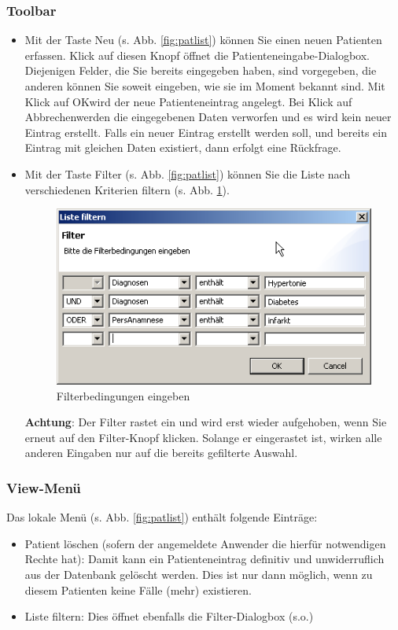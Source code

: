 \subsubsection{Toolbar}
\begin{itemize}
  \item Mit der Taste \glqq Neu\grqq{} (s. Abb. \ref{fig:patlist}) können Sie
  einen neuen Patienten erfassen. Klick
  auf diesen Knopf öffnet die Patienteneingabe-Dialogbox. Diejenigen Felder, die
  Sie bereits eingegeben haben, sind vorgegeben, die anderen können Sie soweit
  eingeben, wie sie im Moment bekannt sind. Mit Klick auf \glqq OK\grqq{}wird
  der neue Patienteneintrag angelegt. Bei Klick auf \glqq Abbrechen\grqq{}werden
  die eingegebenen Daten verworfen und es wird kein neuer Eintrag erstellt.
  Falls ein neuer Eintrag erstellt werden soll, und bereits ein Eintrag mit
  gleichen Daten existiert, dann erfolgt eine Rückfrage.

  \item Mit der Taste \glqq Filter\grqq{} (s. Abb. \ref{fig:patlist}) können Sie
  die Liste nach
  verschiedenen Kriterien filtern (s. Abb. \ref{fig:patlistfilter}).
	\begin{figure}[ht]
    	\includegraphics{images/patlistfilter}
    	\caption{Filterbedingungen eingeben}
    	\label{fig:patlistfilter}
    \end{figure}
	\textbf{Achtung}: Der Filter rastet ein und wird erst wieder aufgehoben, wenn
	Sie erneut auf den Filter-Knopf klicken. Solange er eingerastet ist, wirken
	alle anderen Eingaben nur auf die bereits gefilterte Auswahl.
\end{itemize}
\subsubsection{View-Menü}
Das lokale Menü (s. Abb. \ref{fig:patlist}) enthält folgende Einträge:
\begin{itemize}
  \item Patient löschen (sofern der angemeldete Anwender die hierfür notwendigen
  Rechte hat): Damit kann ein Patienteneintrag definitiv und unwiderruflich aus
  der Datenbank gelöscht werden. Dies ist nur dann möglich, wenn zu diesem
  Patienten keine Fälle (mehr) existieren.
  \item Liste filtern: Dies öffnet ebenfalls die Filter-Dialogbox (s.o.)
\end{itemize}

